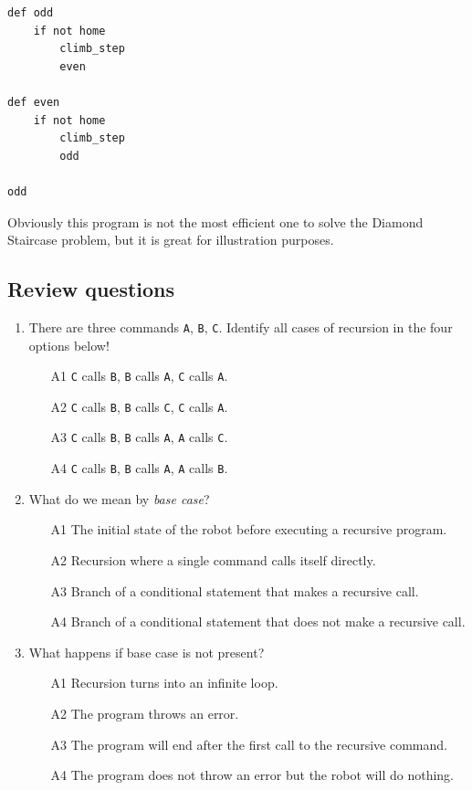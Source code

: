 {{{{\begin{verbatim}
def odd
    if not home
        climb_step
        even
    
def even
    if not home
        climb_step
        odd
    
odd
\end{verbatim}
Obviously this program is not the most efficient one to solve the 
Diamond Staircase problem, but it is great for illustration purposes.

\subsection{Review questions}

\begin{enumerate}
\item There are three commands {\tt A}, {\tt B}, {\tt C}. Identify all cases of recursion in the four options below!
\begin{enumerate}
\item[A1] {\tt C} calls {\tt B}, {\tt B} calls {\tt A}, {\tt C} calls {\tt A}.
\item[A2] {\tt C} calls {\tt B}, {\tt B} calls {\tt C}, {\tt C} calls {\tt A}.
\item[A3] {\tt C} calls {\tt B}, {\tt B} calls {\tt A}, {\tt A} calls {\tt C}.
\item[A4] {\tt C} calls {\tt B}, {\tt B} calls {\tt A}, {\tt A} calls {\tt B}.
\end{enumerate}
\item What do we mean by {\em base case}?
\begin{enumerate}
\item[A1] The initial state of the robot before executing a recursive program.
\item[A2] Recursion where a single command calls itself directly.
\item[A3] Branch of a conditional statement that makes a recursive call.
\item[A4] Branch of a conditional statement that does not make a recursive call.
\end{enumerate}
\item What happens if base case is not present?
\begin{enumerate}
\item[A1] Recursion turns into an infinite loop.
\item[A2] The program throws an error.
\item[A3] The program will end after the first call to the recursive command.
\item[A4] The program does not throw an error but the robot will do nothing.

\end{enumerate}
\end{enumerate}}}}}
